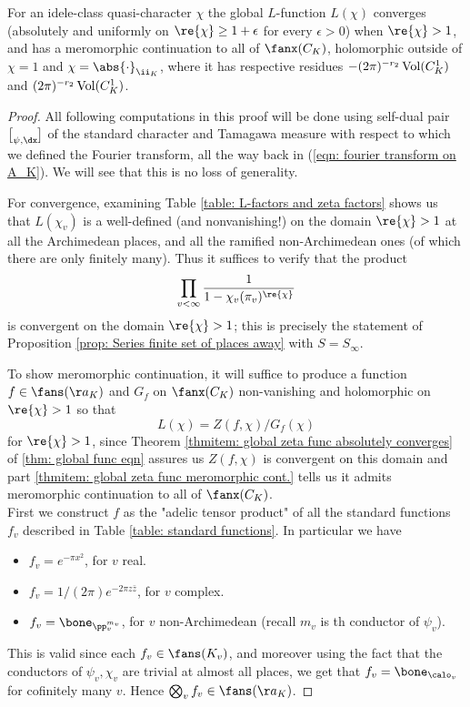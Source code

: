 \documentclass[11pt, x11names, openany]{book}
\begin{document}
\begin{theorem}
\label{thm: global L-func}
For an idele-class quasi-character $\chi$ the global $L$-function $L(\chi)$ converges (absolutely and uniformly on $\re{\chi} \geq 1 + \epsilon$ for every $\epsilon > 0$) when $\re{\chi} > 1$, and has a meromorphic continuation to all of $\fanx(C_K)$, holomorphic outside of $\chi= 1$ and $\chi = \abs{\cdot}_{\ii_K}$, where it has respective residues $- (2\pi)^{-r_2} \operatorname{Vol}(C^1_K)$ and $(2 \pi)^{-r_2} \operatorname{Vol}(C^1_K)$.
\end{theorem} 

\begin{proof}
All following computations in this proof will be done using self-dual pair $\brack{\psi, \dx}$ of the standard character and Tamagawa measure with respect to which we defined the Fourier transform, all the way back in (\ref{eqn: fourier transform on A_K}). We will see that this is no loss of generality.

For convergence, examining Table \ref{table: L-factors and zeta factors} shows us that $L(\chi_v)$ is a well-defined (and nonvanishing!) on the domain $\re{\chi} > 1$ at all the Archimedean places, and all the ramified non-Archimedean ones (of which there are only finitely many). Thus it suffices to verify that the product
\begin{equation*}
    \prod_{v < \infty} \frac{1}{1 - \chi_v(\pi_v)^{\re{\chi}}}
\end{equation*}
is convergent on the domain $\re{\chi} > 1$; this is precisely the statement of Proposition \ref{prop: Series finite set of places away} with $S = S_\infty$.

To show meromorphic continuation, it will suffice to produce a function $f \in \fans(\aa_K)$ and $G_f$ on $\fanx(C_K)$ non-vanishing and holomorphic on $\re{\chi} > 1$ so that
\begin{equation*}
    L(\chi) =  Z(f, \chi)/G_f(\chi)
\end{equation*}
for $\re{\chi} > 1$, since Theorem \ref{thmitem: global zeta func absolutely converges} of \ref{thm: global func eqn} assures us $Z(f, \chi)$ is convergent on this domain and part \ref{thmitem: global zeta func meromorphic cont.} tells us it admits meromorphic continuation to all of $\fanx(C_K)$.\\
First we construct $f$ as the "adelic tensor product" of all the standard functions $f_v$ described in Table \ref{table: standard functions}. In particular we have
\begin{itemize}
    \item $f_v = e^{- \pi x^2}$, for $v$ real.
    \item $f_v = 1/(2\pi) e^{- 2 \pi z \bar{z}}$, for $v$ complex.
    \item $f_v = \bone_{\pp_v^{m_v}}$, for $v$ non-Archimedean (recall $m_v$ is th conductor of $\psi_v$).
\end{itemize}
This is valid since each $f_v \in \fans(K_v)$, and moreover using the fact that the conductors of $\psi_v, \chi_v$ are trivial at almost all places, we get that $f_v = \bone_{\calo_v}$ for cofinitely many $v$. Hence $\bigotimes_{v} f_v \in \fans(\aa_K)$.


\end{proof}
\end{document}
